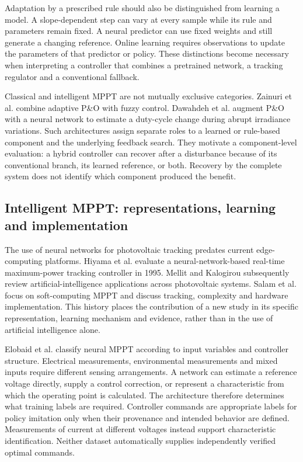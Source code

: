 Adaptation by a prescribed rule should also be distinguished from learning a model. A slope-dependent step can vary at every sample while its rule and parameters remain fixed. A neural predictor can use fixed weights and still generate a changing reference. Online learning requires observations to update the parameters of that predictor or policy. These distinctions become necessary when interpreting a controller that combines a pretrained network, a tracking regulator and a conventional fallback.

Classical and intelligent MPPT are not mutually exclusive categories. Zainuri et al. \cite{zainuri} combine adaptive P\&O with fuzzy control. Dawahdeh et al. \cite{hybrid2024} augment P\&O with a neural network to estimate a duty-cycle change during abrupt irradiance variations. Such architectures assign separate roles to a learned or rule-based component and the underlying feedback search. They motivate a component-level evaluation: a hybrid controller can recover after a disturbance because of its conventional branch, its learned reference, or both. Recovery by the complete system does not identify which component produced the benefit.

\subsection{Intelligent MPPT: representations, learning and implementation}
The use of neural networks for photovoltaic tracking predates current edge-computing platforms. Hiyama et al. \cite{hiyama} evaluate a neural-network-based real-time maximum-power tracking controller in 1995. Mellit and Kalogirou \cite{mellit} subsequently review artificial-intelligence applications across photovoltaic systems. Salam et al. \cite{salam} focus on soft-computing MPPT and discuss tracking, complexity and hardware implementation. This history places the contribution of a new study in its specific representation, learning mechanism and evidence, rather than in the use of artificial intelligence alone.

Elobaid et al. \cite{elobaid} classify neural MPPT according to input variables and controller structure. Electrical measurements, environmental measurements and mixed inputs require different sensing arrangements. A network can estimate a reference voltage directly, supply a control correction, or represent a characteristic from which the operating point is calculated. The architecture therefore determines what training labels are required. Controller commands are appropriate labels for policy imitation only when their provenance and intended behavior are defined. Measurements of current at different voltages instead support characteristic identification. Neither dataset automatically supplies independently verified optimal commands.

